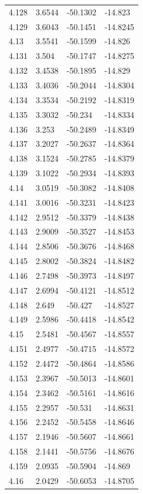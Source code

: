 \begin{tabular}{llll}
4.128 & 3.6544 & -50.1302 & -14.823 \\
4.129 & 3.6043 & -50.1451 & -14.8245 \\
4.13 & 3.5541 & -50.1599 & -14.826 \\
4.131 & 3.504 & -50.1747 & -14.8275 \\
4.132 & 3.4538 & -50.1895 & -14.829 \\
4.133 & 3.4036 & -50.2044 & -14.8304 \\
4.134 & 3.3534 & -50.2192 & -14.8319 \\
4.135 & 3.3032 & -50.234 & -14.8334 \\
4.136 & 3.253 & -50.2489 & -14.8349 \\
4.137 & 3.2027 & -50.2637 & -14.8364 \\
4.138 & 3.1524 & -50.2785 & -14.8379 \\
4.139 & 3.1022 & -50.2934 & -14.8393 \\
4.14 & 3.0519 & -50.3082 & -14.8408 \\
4.141 & 3.0016 & -50.3231 & -14.8423 \\
4.142 & 2.9512 & -50.3379 & -14.8438 \\
4.143 & 2.9009 & -50.3527 & -14.8453 \\
4.144 & 2.8506 & -50.3676 & -14.8468 \\
4.145 & 2.8002 & -50.3824 & -14.8482 \\
4.146 & 2.7498 & -50.3973 & -14.8497 \\
4.147 & 2.6994 & -50.4121 & -14.8512 \\
4.148 & 2.649 & -50.427 & -14.8527 \\
4.149 & 2.5986 & -50.4418 & -14.8542 \\
4.15 & 2.5481 & -50.4567 & -14.8557 \\
4.151 & 2.4977 & -50.4715 & -14.8572 \\
4.152 & 2.4472 & -50.4864 & -14.8586 \\
4.153 & 2.3967 & -50.5013 & -14.8601 \\
4.154 & 2.3462 & -50.5161 & -14.8616 \\
4.155 & 2.2957 & -50.531 & -14.8631 \\
4.156 & 2.2452 & -50.5458 & -14.8646 \\
4.157 & 2.1946 & -50.5607 & -14.8661 \\
4.158 & 2.1441 & -50.5756 & -14.8676 \\
4.159 & 2.0935 & -50.5904 & -14.869 \\
4.16 & 2.0429 & -50.6053 & -14.8705 \\

\end{tabular}
